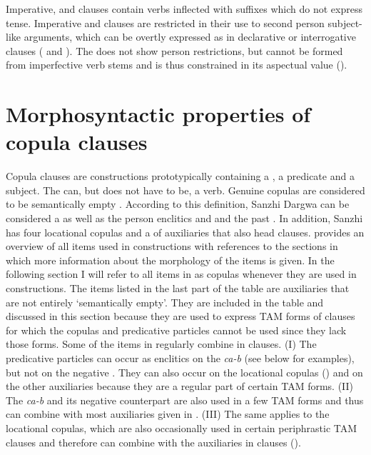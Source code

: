 Imperative,  and  clauses contain verbs inflected with suffixes which do not express tense. Imperative and  clauses are restricted in their use to second person subject-like arguments, which can be overtly expressed as in declarative or interrogative clauses ( and ). The  does not show person restrictions, but cannot be formed from imperfective verb stems and is thus constrained in its aspectual value ().




\section{Morphosyntactic properties of copula clauses}
\label{sec:copulaclauses}

Copula clauses are constructions prototypically containing a , a  predicate and a  subject. The  can, but does not have to be, a verb. Genuine copulas are considered to be semantically empty \citep[5]{Pustet2005}. According to this definition, Sanzhi Dargwa  can be considered a  as well as the person enclitics  and  and the past  . In addition, Sanzhi has four locational copulas and a  of auxiliaries that also head  clauses.  provides an overview of all items used in  constructions with references to the sections in which more information about the morphology of the items is given. In the following section I will refer to all items in  as copulas whenever they are used in  constructions. The items listed in the last part of the table are auxiliaries that are not entirely `semantically empty'. They are included in the table and discussed in this section because they are used to express TAM forms of  clauses for which the copulas and predicative particles cannot be used since they lack those forms. Some of the items in  regularly combine in  clauses. (I) The predicative particles can occur as enclitics on the  \textit{ca-b} (see below for examples), but not on the negative . They can also occur on the locational copulas () and on the other auxiliaries because they are a regular part of certain TAM forms. (II) The  \textit{ca-b} and its negative counterpart are also used in a few TAM forms and thus can combine with most auxiliaries given in  . (III) The same applies to the locational copulas, which are also occasionally used in certain periphrastic TAM clauses and therefore can combine with the auxiliaries in  clauses ().

